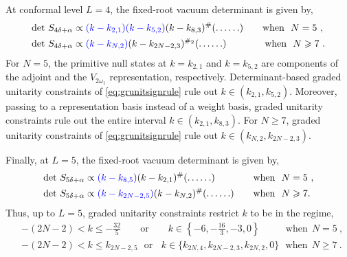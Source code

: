 At conformal level $L = 4$, the fixed-root vacuum determinant is given by,
\begin{equation} \label{eq: so2NoddL4}
\begin{split}
    &\text{det}~S_{4\delta + \alpha} \propto \textcolor{blue}{(k-k_{2,1})(k-k_{5,2})}(k-k_{8,3})^{\#}(\ldots\ldots) \qquad \text{when} \ \ N=5~, \\
    &\text{det}~S_{4\delta + \alpha} \propto \textcolor{blue}{(k - k_{N,2})}(k-k_{2N-2,3})^{\#_2} (\ldots \ldots) \qquad \qquad \text{when} \ \ N \geqslant 7~.\\ 
\end{split}   
\end{equation}
For $N = 5$, the primitive null states at $k = k_{2,1}$ and $k = k_{5,2}$ are components of the adjoint and the $V_{2\omega_1}$ representation, respectively. Determinant-based graded unitarity constraints of \eqref{eq:grunitsignrule} rule out $k \in (k_{2,1}, k_{5,2})$. Moreover, passing to a representation basis instead of a weight basis, graded unitarity constraints rule out the entire interval $k \in (k_{2,1}, k_{8,3})$. For $N \geqslant 7$, graded unitarity constraints of \eqref{eq:grunitsignrule} rule out $k \in (k_{N,2}, k_{2N-2,3})$. 

Finally, at $L = 5$, the fixed-root vacuum determinant is given by,
\begin{equation} \label{eq: so2NoddL5}
\begin{split}
    &\text{det}~S_{5\delta + \alpha} \propto \textcolor{blue}{(k - k_{8,5})}(k-k_{2,1})^{\#} (\ldots \ldots) \qquad \qquad \text{when} \ \ N=5~, \\    
    &\text{det}~S_{5\delta + \alpha} \propto \textcolor{blue}{(k - k_{2N-2,5})}(k-k_{N,2})^{\#} (\ldots \ldots) \qquad \text{when} \ \ N \geqslant 7.
\end{split}
\end{equation}
Thus, up to $L = 5$, graded unitarity constraints restrict $k$ to be in the regime,
\begin{equation} \label{eq:lowlevelsoOdd}
\begin{split}
    &-(2N-2) < k \leqslant -\frac{32}{5} \qquad \text{or} \qquad k \in \left\{-6, -\frac{16}{3}, -3, 0 \right\}\qquad \ \ \ \text{when} \ \ N=5~,  \\
    &-(2N-2) < k \leqslant k_{2N-2,5} \ \ \ \text{or} \ \ \ \  k \in \{k_{2N,4}, k_{2N-2,3}, k_{2N,2}, 0\}  \ \ \ \text{when} \ \ N \geqslant 7~. 
\end{split}
\end{equation}

